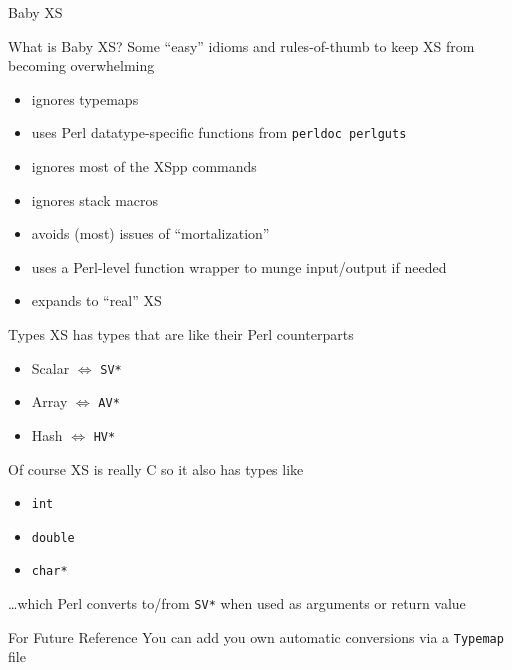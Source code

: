 \documentclass{beamer}
\providecommand{\code}[1]{{\texttt{\scriptsize{#1}}}}
\begin{document}
\begin{frame}{Baby XS}
  \begin{block}{What is Baby XS?}
    Some ``easy'' idioms and rules-of-thumb to keep XS from becoming overwhelming
  \end{block}
  \begin{itemize}
    \item ignores typemaps
    \item uses Perl datatype-specific functions from \code{perldoc perlguts}
    \item ignores most of the XSpp commands
    \item ignores stack macros
    \item avoids (most) issues of ``mortalization''
    \item uses a Perl-level function wrapper to munge input/output if needed
    \item expands to ``real'' XS
  \end{itemize}
\end{frame}

\begin{frame}{Types}
  XS has types that are like their Perl counterparts
  \begin{itemize}
    \item Scalar $\Leftrightarrow$ \code{SV*}
    \item Array $\Leftrightarrow$ \code{AV*}
    \item Hash $\Leftrightarrow$ \code{HV*}
  \end{itemize}
  Of course XS is really C so it also has types like
  \begin{itemize}
    \item \code{int}
    \item \code{double}
    \item \code{char*}
  \end{itemize}
  \ldots which Perl converts to/from \code{SV*} when used as arguments or return value
  \begin{block}{For Future Reference}
    You can add you own automatic conversions via a \code{Typemap} file
  \end{block}
\end{frame}
\end{document}
